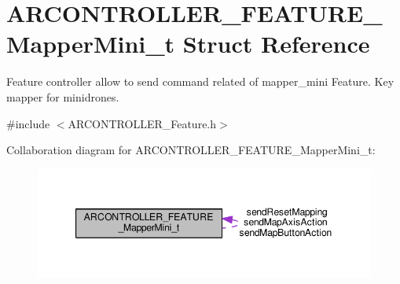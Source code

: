 \hypertarget{struct_a_r_c_o_n_t_r_o_l_l_e_r___f_e_a_t_u_r_e___mapper_mini__t}{}\section{A\+R\+C\+O\+N\+T\+R\+O\+L\+L\+E\+R\+\_\+\+F\+E\+A\+T\+U\+R\+E\+\_\+\+Mapper\+Mini\+\_\+t Struct Reference}
\label{struct_a_r_c_o_n_t_r_o_l_l_e_r___f_e_a_t_u_r_e___mapper_mini__t}


Feature controller allow to send command related of mapper\+\_\+mini Feature. Key mapper for minidrones.  




{\ttfamily \#include $<$A\+R\+C\+O\+N\+T\+R\+O\+L\+L\+E\+R\+\_\+\+Feature.\+h$>$}



Collaboration diagram for A\+R\+C\+O\+N\+T\+R\+O\+L\+L\+E\+R\+\_\+\+F\+E\+A\+T\+U\+R\+E\+\_\+\+Mapper\+Mini\+\_\+t\+:
\nopagebreak
\begin{figure}[H]
\begin{center}
\leavevmode
\includegraphics[width=347pt]{struct_a_r_c_o_n_t_r_o_l_l_e_r___f_e_a_t_u_r_e___mapper_mini__t__coll__graph}
\end{center}
\end{figure}
